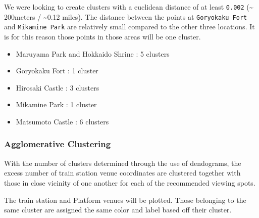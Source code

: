 \documentclass[11pt]{article}
\providecommand{\tightlist}{%
      \setlength{\itemsep}{0pt}\setlength{\parskip}{0pt}}
\begin{document}
    We were looking to create clusters with a euclidean distance of at least
\texttt{0.002} (\textasciitilde{} 200meters / \textasciitilde0.12
miles). The distance between the points at \texttt{Goryokaku\ Fort} and
\texttt{Mikamine\ Park} are relatively small compared to the other three
locations. It is for this reason those points in those areas will be one
cluster.

\begin{itemize}
\tightlist
\item
  Maruyama Park and Hokkaido Shrine : 5 clusters
\item
  Goryokaku Fort : 1 cluster
\item
  Hirosaki Castle : 3 clusters
\item
  Mikamine Park : 1 cluster
\item
  Matsumoto Castle : 6 clusters
\end{itemize}

    \hypertarget{agglomerative-clustering}{%
\subsubsection{Agglomerative
Clustering}\label{agglomerative-clustering}}

With the number of clusters determined through the use of dendograms, the excess number of train station venue 
coordinates are clustered together with those in close vicinity of one another for each of the recommended 
viewing spots.

The train station and Platform venues will be plotted. Those belonging to the same
cluster are assigned the same color and label based off their cluster.
\end{document}
